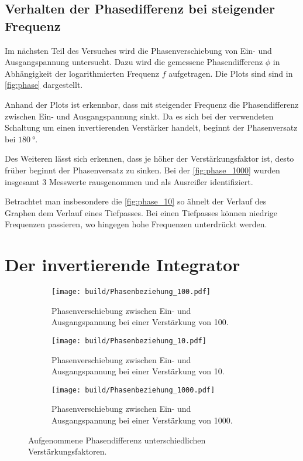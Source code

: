 \subsection{Verhalten der Phasedifferenz bei steigender Frequenz}
Im nächsten Teil des Versuches wird die Phasenverschiebung von Ein- und Ausgangspannung 
untersucht.
Dazu wird die gemessene Phasendifferenz $\phi$ in Abhängigkeit der logarithmierten Frequenz $f$
aufgetragen.
Die Plots sind sind in \autoref{fig:phase} dargestellt.

Anhand der Plots ist erkennbar, dass mit steigender Frequenz die Phasendifferenz zwischen 
Ein- und Ausgangspannung sinkt.
Da es sich bei der verwendeten Schaltung um einen invertierenden Verstärker handelt, beginnt 
der Phasenversatz bei $\SI{180}{\degree}$.

Des Weiteren lässt sich erkennen, dass je höher der Verstärkungsfaktor ist, desto früher
beginnt der Phasenversatz zu sinken. 
Bei der \autoref{fig:phase_1000} wurden insgesamt 3 Messwerte rausgenommen und 
als Ausreißer identifiziert.

Betrachtet man insbesondere die \autoref{fig:phase_10} so ähnelt der Verlauf
des Graphen dem Verlauf eines Tiefpasses.
Bei einen Tiefpasses können niedrige Frequenzen passieren, wo hingegen hohe Frequenzen
unterdrückt werden.

\section{Der invertierende Integrator}

\begin{figure}
    \centering
    \begin{subfigure}[b]{0.6\textwidth}
        \centering
        \texttt{[image: build/Phasenbeziehung\_100.pdf]}
        \caption{Phasenverschiebung zwischen Ein- und Ausgangspannung bei einer Verstärkung von 100.}
        \label{fig:phase_100}
    \end{subfigure}
    \begin{subfigure}[b]{0.6\textwidth}
        \centering
        \texttt{[image: build/Phasenbeziehung\_10.pdf]}
        \caption{Phasenverschiebung zwischen Ein- und Ausgangspannung bei einer Verstärkung von 10.}
        \label{fig:phase_10}
    \end{subfigure}    
    \begin{subfigure}[b]{0.6\textwidth}
        \centering
        \texttt{[image: build/Phasenbeziehung\_1000.pdf]}
        \caption{Phasenverschiebung zwischen Ein- und Ausgangspannung bei einer Verstärkung von 1000.}
        \label{fig:phase_1000}
    \end{subfigure}
       \caption{Aufgenommene Phasendifferenz unterschiedlichen Verstärkungsfaktoren.}
       \label{fig:phase}
\end{figure}
\FloatBarrier


